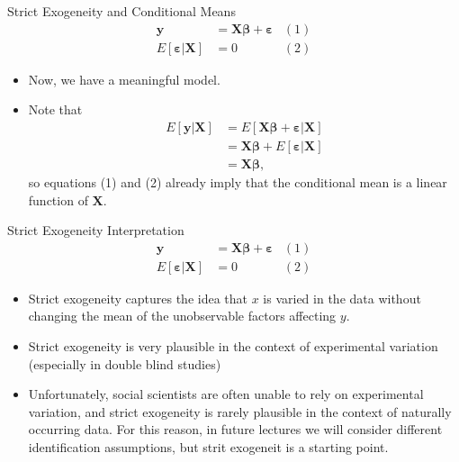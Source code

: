 \documentclass[english,xcolor={dvipsnames},aspectratio=169]{beamer}
\begin{document}
\begin{frame}{Strict Exogeneity and Conditional Means}
\begin{align*}
\boldsymbol{y} & =  \boldsymbol{X}\boldsymbol{\beta}+\boldsymbol{\varepsilon}	& (1)\\
E\left[\boldsymbol{\varepsilon}|\boldsymbol{X}\right] & =  0						& (2)
\end{align*}
\begin{itemize}
	\item Now, we have a meaningful model. 
	\item Note that
\begin{align*}
E\left[\boldsymbol{y}|\boldsymbol{X}\right] & =  E\left[\boldsymbol{X}\boldsymbol{\beta}+\boldsymbol{\varepsilon}|\boldsymbol{X}\right]\\
 & =  \boldsymbol{X}\boldsymbol{\beta}+E\left[\boldsymbol{\varepsilon}|\boldsymbol{X}\right]\\
 &  = \boldsymbol{X}\boldsymbol{\beta},
\end{align*}
so equations (1) and (2) already imply that the conditional mean is a linear function of $\boldsymbol{X}$.
\end{itemize}
\end{frame}

\begin{frame}{Strict Exogeneity Interpretation}
\begin{align*}
\boldsymbol{y} & =  \boldsymbol{X}\boldsymbol{\beta}+\boldsymbol{\varepsilon}	& (1)\\
E\left[\boldsymbol{\varepsilon}|\boldsymbol{X}\right] & =  0						& (2)
\end{align*}
\begin{itemize}
	\item Strict exogeneity captures the idea that $x$ is varied in the data without changing the mean
	of the unobservable factors affecting $y$. 

	\medskip
	\item Strict exogeneity is very plausible in the context of experimental variation (especially in double blind studies) 

	\medskip
	\item Unfortunately, social scientists are often unable to rely on experimental variation, and strict exogeneity 
	is rarely plausible in the context of naturally occurring data. For this reason, in future lectures we will consider
	different identification assumptions, but strit exogeneit is a starting point. 
\end{itemize}
\end{frame}
\end{document}
